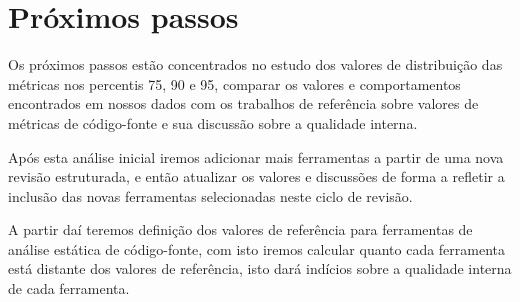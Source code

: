 \section{Próximos passos}

Os próximos passos estão concentrados no estudo dos valores de distribuição
das métricas nos percentis 75, 90 e 95, comparar os valores e comportamentos
encontrados em nossos dados com os trabalhos de referência sobre valores de
métricas de código-fonte e sua discussão sobre a qualidade interna.

Após esta análise inicial iremos adicionar mais ferramentas a partir de uma
nova revisão estruturada, e então atualizar os valores e discussões de forma a
refletir a inclusão das novas ferramentas selecionadas neste ciclo de revisão.

A partir daí teremos definição dos valores de referência para ferramentas de
análise estática de código-fonte, com isto iremos calcular quanto cada
ferramenta está distante dos valores de referência, isto dará indícios sobre a
qualidade interna de cada ferramenta.
